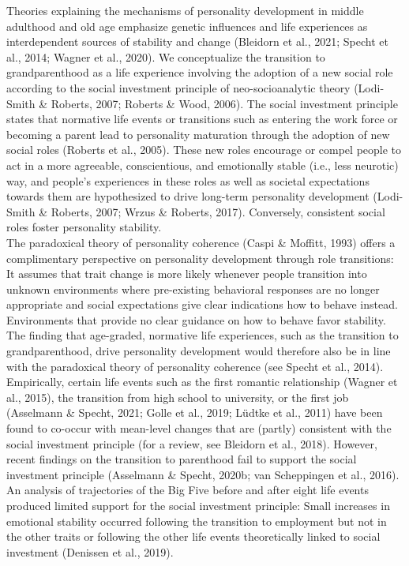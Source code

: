 \documentclass[
  english,
  man, noextraspace,floatsintext]{apa7}
\begin{document}
Theories explaining the mechanisms of personality development in middle adulthood and old age emphasize genetic influences and life experiences as interdependent sources of stability and change (Bleidorn et al., 2021; Specht et al., 2014; Wagner et al., 2020). We conceptualize the transition to grandparenthood as a life experience involving the adoption of a new social role according to the social investment principle of neo-socioanalytic theory (Lodi-Smith \& Roberts, 2007; Roberts \& Wood, 2006). The social investment principle states that normative life events or transitions such as entering the work force or becoming a parent lead to personality maturation through the adoption of new social roles (Roberts et al., 2005). These new roles encourage or compel people to act in a more agreeable, conscientious, and emotionally stable (i.e., less neurotic) way, and people's experiences in these roles as well as societal expectations towards them are hypothesized to drive long-term personality development (Lodi-Smith \& Roberts, 2007; Wrzus \& Roberts, 2017). Conversely, consistent social roles foster personality stability.\\
The paradoxical theory of personality coherence (Caspi \& Moffitt, 1993) offers a complimentary perspective on personality development through role transitions: It assumes that trait change is more likely whenever people transition into unknown environments where pre-existing behavioral responses are no longer appropriate and social expectations give clear indications how to behave instead. Environments that provide no clear guidance on how to behave favor stability. The finding that age-graded, normative life experiences, such as the transition to grandparenthood, drive personality development would therefore also be in line with the paradoxical theory of personality coherence (see Specht et al., 2014).\\
Empirically, certain life events such as the first romantic relationship (Wagner et al., 2015), the transition from high school to university, or the first job (Asselmann \& Specht, 2021; Golle et al., 2019; Lüdtke et al., 2011) have been found to co-occur with mean-level changes that are (partly) consistent with the social investment principle (for a review, see Bleidorn et al., 2018). However, recent findings on the transition to parenthood fail to support the social investment principle (Asselmann \& Specht, 2020b; van Scheppingen et al., 2016). An analysis of trajectories of the Big Five before and after eight life events produced limited support for the social investment principle: Small increases in emotional stability occurred following the transition to employment but not in the other traits or following the other life events theoretically linked to social investment (Denissen et al., 2019).\\
\end{document}
